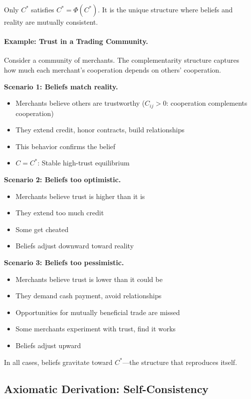 \documentclass[12pt,a4paper]{article}
\begin{document}
Only $C^*$ satisfies $C^* = \Phi(C^*)$. It is the unique structure where
beliefs and reality are mutually consistent.

\paragraph{Example: Trust in a Trading Community.}
Consider a community of merchants. The complementarity structure captures
how much each merchant's cooperation depends on others' cooperation.

\textbf{Scenario 1: Beliefs match reality.}
\begin{itemize}
  \item Merchants believe others are trustworthy ($C_{ij} > 0$: cooperation complements cooperation)
  \item They extend credit, honor contracts, build relationships
  \item This behavior confirms the belief
  \item $C = C^*$: Stable high-trust equilibrium
\end{itemize}

\textbf{Scenario 2: Beliefs too optimistic.}
\begin{itemize}
  \item Merchants believe trust is higher than it is
  \item They extend too much credit
  \item Some get cheated
  \item Beliefs adjust downward toward reality
\end{itemize}

\textbf{Scenario 3: Beliefs too pessimistic.}
\begin{itemize}
  \item Merchants believe trust is lower than it could be
  \item They demand cash payment, avoid relationships
  \item Opportunities for mutually beneficial trade are missed
  \item Some merchants experiment with trust, find it works
  \item Beliefs adjust upward
\end{itemize}

In all cases, beliefs gravitate toward $C^*$---the structure that reproduces itself.

\subsection{Axiomatic Derivation: Self-Consistency}
\end{document}
